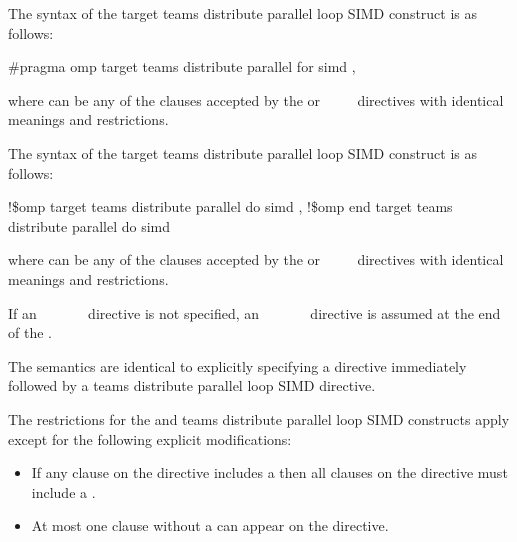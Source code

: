 {{{{\syntax
\ccppspecificstart
The syntax of the target teams distribute parallel loop SIMD construct is as follows:

\begin{boxedcode}
\#pragma omp target teams distribute parallel for simd \plc{\textbackslash}
            \plc{[clause[ [},\plc{] clause] ... ] new-line}
\end{boxedcode}

where  can be any of the clauses accepted by the  or 
~~~~
directives with identical meanings and restrictions.
\ccppspecificend

\pagebreak

\fortranspecificstart
The syntax of the target teams distribute parallel loop SIMD construct is as follows:

\begin{boxedcode}
!\$omp target teams distribute parallel do simd \plc{[clause[ [},\plc{] clause] ... ]}
\plc{[}!\$omp end target teams distribute parallel do simd\plc{]}
\end{boxedcode}

where  can be any of the clauses accepted by the 
 or ~~~~
directives with identical meanings and restrictions.

If an ~~~~~~ 
directive is not specified, an 
~~~~~~ 
directive is assumed at the end of the .
\fortranspecificend

\descr
The semantics are identical to explicitly specifying a  
directive immediately followed by a teams distribute parallel loop 
SIMD directive.

\restrictions
The restrictions for the  and teams distribute parallel 
loop SIMD constructs apply except for the following explicit modifications:

\begin{itemize}
\item If any  clause on the directive includes a
       then all  clauses 
      on the directive must include a .

\item At most one  clause without a 
       can appear on the directive.


\end{itemize}}}}}
